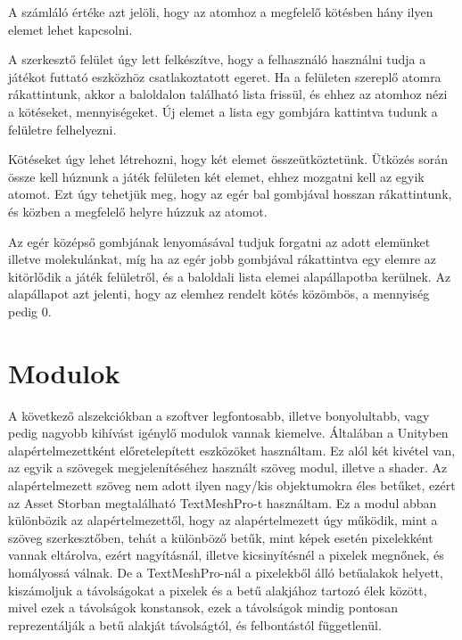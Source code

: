 \documentclass[colorlinks]{thesis-ekf}
\theoremstyle{definition}
\theoremstyle{remark}
\begin{document}
A számláló értéke azt jelöli, hogy az atomhoz a megfelelő kötésben hány ilyen elemet lehet kapcsolni.

A szerkesztő felület úgy lett felkészítve, hogy a felhasználó használni tudja a játékot futtató eszközhöz csatlakoztatott egeret. Ha a felületen szereplő atomra rákattintunk, akkor a baloldalon található lista frissül, és ehhez az atomhoz nézi a kötéseket, mennyiségeket. Új elemet a lista egy gombjára kattintva tudunk a felületre felhelyezni.

Kötéseket úgy lehet létrehozni, hogy két elemet összeütköztetünk. Ütközés során össze kell húznunk a játék felületen két elemet, ehhez mozgatni kell az egyik atomot. Ezt úgy tehetjük meg, hogy az egér bal gombjával hosszan rákattintunk, és közben a megfelelő helyre húzzuk az atomot.

Az egér középső gombjának lenyomásával tudjuk forgatni az adott elemünket illetve molekulánkat, míg ha az egér jobb gombjával rákattintva egy elemre az kitörlődik a játék felületről, és a baloldali lista elemei alapállapotba kerülnek. Az alapállapot azt jelenti, hogy az elemhez rendelt kötés közömbös, a mennyiség pedig 0. 
\section{Modulok}
A következő alszekciókban a szoftver legfontosabb, illetve bonyolultabb, vagy pedig nagyobb kihívást igénylő modulok vannak kiemelve. Általában a Unityben alapértelmezettként előretelepített eszközöket használtam. Ez alól két kivétel van, az egyik a szövegek megjelenítéséhez használt szöveg modul, illetve a shader. Az alapértelmezett szöveg nem adott ilyen nagy/kis objektumokra éles betűket, ezért az Asset Storban megtalálható TextMeshPro-t használtam. Ez a modul abban különbözik az alapértelmezettől, hogy az alapértelmezett úgy működik, mint a szöveg szerkesztőben, tehát a különböző betűk, mint képek esetén pixelekként vannak eltárolva, ezért nagyításnál, illetve kicsinyítésnél a pixelek megnőnek, és homályossá válnak. De a TextMeshPro-nál a pixelekből álló betűalakok helyett, kiszámoljuk a távolságokat a pixelek és a betű alakjához tartozó élek között, mivel ezek a távolságok konstansok, ezek a távolságok mindig pontosan reprezentálják a betű alakját távolságtól, és felbontástól függetlenül.\cite{textmesh_pro}
\end{document}
